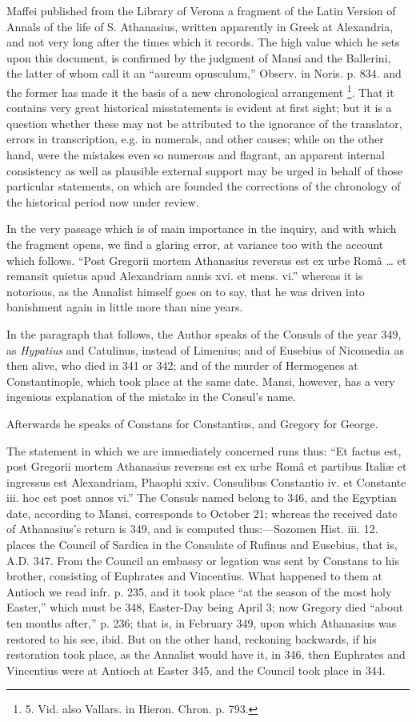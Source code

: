 Maffei published from the
Library of Verona a fragment of the Latin Version of Annals of the
life of S. Athanasius, written apparently in Greek at Alexandria, and
not very long after the times which it records. The high value which
he sets upon this document, is confirmed by the judgment of Mansi and
the Ballerini, the latter of whom call it an “aureum opusculum,”
Observ. in Noris. p. 834. and the former has made it the basis of a
new chronological arrangement \footnote{5. Vid.
also Vallars. in Hieron. Chron. p. 793.}.
That it contains very great historical misstatements is evident at
first sight; but it is a question whether these may not be attributed
to the ignorance of the translator, errors in transcription, e.g. in
numerals, and other causes; while on the other hand, were the
mistakes even so numerous and flagrant, an apparent internal
consistency as well as plausible external support may be urged in
behalf of those particular statements, on which are founded the
corrections of the chronology of the historical period now under
review.

In the very passage which is
of main importance in the inquiry, and with which the fragment opens,
we find a glaring error, at variance too with the account which
follows. “Post Gregorii mortem Athanasius reversus est ex urbe Româ
… et remansit quietus apud Alexandriam annis xvi. et mens. vi.”
whereas it is notorious, as the Annalist himself goes on to say, that
he was driven into banishment again in little more than nine years.

In the paragraph that follows,
the Author speaks of the Consuls of the year 349, as \emph{Hypatius}
and Catulinus, instead of Limenius; and of Eusebius of Nicomedia as
then alive, who died in 341 or 342; and of the murder of Hermogenes at
Constantinople, which took place at the same date. Mansi, however, has
a very ingenious explanation of the mistake in the Consul's name.

Afterwards he speaks of
Constans for Constantius, and Gregory for George.

The statement in which we are
immediately concerned runs thus: “Et factus est, post Gregorii
mortem Athanasius reversus est ex urbe Româ et partibus Italiæ et
ingressus est Alexandriam, Phaophi xxiv. Consulibus Constantio iv. et
Constante iii. hoc est post annos vi.” The Consuls named belong to
346, and the Egyptian date, according to Mansi, corresponds to October
21; whereas the received date of Athanasius's return is 349, and is
computed thus:—Sozomen Hist. iii. 12. places the Council of Sardica
in the Consulate of Rufinus and Eusebius, that is, A.D.
347. From the Council an embassy or legation was sent by Constans to
his brother, consisting of Euphrates and Vincentius. What happened to
them at Antioch we read infr. p. 235, and it took place “at the
season of the most holy Easter,” which must be 348, Easter-Day
being April 3; now Gregory died “about ten months after,” p. 236;
that is, in February 349, upon which Athanasius was restored to his
see, ibid. But on the other hand, reckoning backwards, if his
restoration took place, as the Annalist would have it, in 346, then
Euphrates and Vincentius were at Antioch at Easter 345, and the
Council took place in 344.

